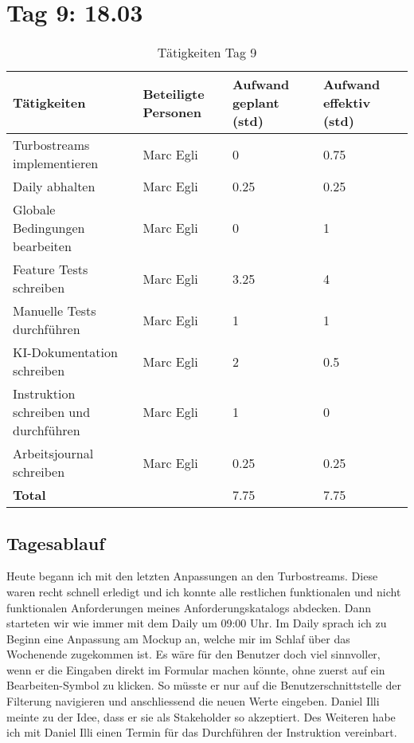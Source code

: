\section{Tag 9: 18.03}
\begin{table}[H]
    \begin{tabular}{|L{0.4\textwidth}|C{60pt}|C{60pt}|C{60pt}|}
        \hline
        \color{white}Tätigkeiten & \color{white}Beteiligte \color{white}Personen & \color{white}Aufwand geplant (std) & \color{white}Aufwand effektiv (std) \\
        \hline
         Turbostreams implementieren & Marc Egli & 0 & 0.75 \\
        \hline
        Daily abhalten & Marc Egli & 0.25 & 0.25 \\
        \hline
        Globale Bedingungen bearbeiten & Marc Egli & 0 & 1 \\
        \hline
        Feature Tests schreiben & Marc Egli & 3.25 & 4 \\
        \hline
        Manuelle Tests durchführen & Marc Egli & 1 & 1 \\
        \hline
        KI-Dokumentation schreiben & Marc Egli & 2 & 0.5 \\
        \hline
        Instruktion schreiben und durchführen & Marc Egli & 1 & 0 \\
        \hline
        Arbeitsjournal schreiben & Marc Egli & 0.25 & 0.25 \\
        \hline
        \textbf{Total} &  & 7.75  & 7.75 \\
        \hline
    \end{tabular}
    \caption{Tätigkeiten Tag 9}
\end{table}

\subsection*{Tagesablauf}
Heute begann ich mit den letzten Anpassungen an den Turbostreams. Diese waren recht schnell erledigt und ich konnte alle restlichen funktionalen und nicht
funktionalen Anforderungen meines Anforderungskatalogs abdecken. Dann starteten wir wie immer mit dem Daily um 09:00 Uhr.
Im Daily sprach ich zu Beginn eine Anpassung am Mockup an, welche mir im Schlaf über das Wochenende zugekommen ist. Es wäre für den Benutzer doch viel sinnvoller, 
wenn er die Eingaben direkt im Formular machen könnte, ohne zuerst auf ein Bearbeiten-Symbol zu klicken. So müsste er nur auf die Benutzerschnittstelle der Filterung navigieren
und anschliessend die neuen Werte eingeben. Daniel Illi meinte zu der Idee, dass er sie als Stakeholder so akzeptiert. 
Des Weiteren habe ich mit Daniel Illi einen Termin für das Durchführen der Instruktion vereinbart. 

